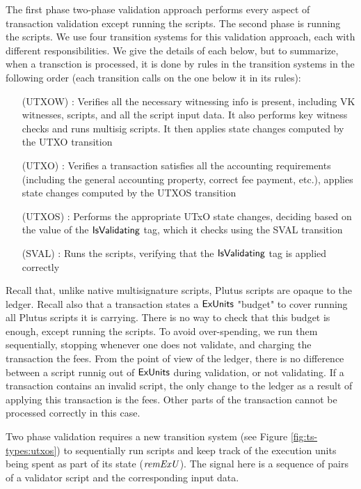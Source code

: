 The first phase two-phase validation approach
performs every aspect of transaction validation except running the scripts.
The second phase is running the scripts. We use four transition systems
for this validation approach, each with different responsibilities. We
give the details of each below, but to summarize, when a transction is processed,
it is done by rules in the transition systems in the following order
(each transition calls on the one below it in its rules):

\begin{itemize}
  \item[(UTXOW)] : Verifies all the necessary witnessing info is present, including
  VK witnesses, scripts, and all the script input data. It also performs
  key witness checks and runs multisig scripts. It then applies state changes
  computed by the UTXO transition
  \item[(UTXO)] : Verifies a transaction satisfies all the accounting requirements
  (including the general accounting property, correct fee payment, etc.),
  applies state changes computed by the UTXOS transition
  \item[(UTXOS)] : Performs the appropriate UTxO state changes, deciding based on the
  value of the $\mathsf{IsValidating}$ tag, which it checks using the SVAL transition
  \item[(SVAL)] : Runs the scripts, verifying that the $\mathsf{IsValidating}$ tag
  is applied correctly
\end{itemize}


Recall that, unlike native
multisignature scripts, Plutus scripts are opaque to the ledger. Recall also
that a transaction states a $\mathsf{ExUnits}$ "budget" to cover running all Plutus
scripts it is carrying. There is no way to check that this budget is enough,
except running the scripts. To avoid over-spending, we run them sequentially,
stopping whenever one does not validate, and charging the transaction the
fees. From the point of view of the ledger, there is no difference
between a script runnig out of $\mathsf{ExUnits}$ during validation, or not validating.
If a transaction contains an invalid script, the only change to the ledger
as a result of applying this transaction is the fees. Other parts of
the transaction cannot be processed correctly in this case.

Two phase validation requires a new transition system
(see Figure \ref{fig:ts-types:utxos}) to sequentially run
scripts and keep track of the execution units being spent as part of its state
($\mathit{remExU}$). The signal here is a sequence of pairs of a validator
script and the corresponding input data.

